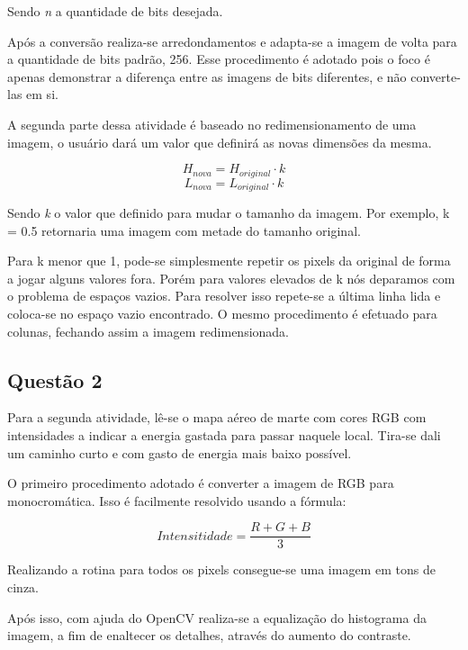 \documentclass[conference]{IEEEtran}
\begin{document}
Sendo \textit{n} a quantidade de bits desejada.

Após a conversão realiza-se arredondamentos e adapta-se a imagem de volta
para a quantidade de bits padrão, 256. Esse procedimento é adotado pois
o foco é apenas demonstrar a diferença entre as imagens de bits diferentes, 
e não converte-las em si.

A segunda parte dessa atividade é baseado no redimensionamento de uma imagem,
o usuário dará um valor que definirá as novas dimensões da mesma.

\begin{equation}
    H_{nova} = H_{original} \cdot k
\end{equation}
\begin{equation}
    L_{nova} = L_{original} \cdot k
\end{equation}

Sendo \textit{k} o valor que definido para mudar o tamanho da imagem. 
Por exemplo, k = 0.5 retornaria uma imagem com metade do tamanho original.

Para k menor que 1, pode-se simplesmente repetir os pixels da original
de forma a jogar alguns valores fora. 
Porém para valores elevados de k nós deparamos com o problema de espaços vazios.
Para resolver isso repete-se a última linha lida e coloca-se no espaço vazio encontrado.
O mesmo procedimento é efetuado para colunas, fechando assim a imagem redimensionada.

\subsection{Questão 2}

Para a segunda atividade, lê-se o mapa aéreo de marte com cores RGB com intensidades
a indicar a energia gastada para passar naquele local. Tira-se dali um caminho curto e com
gasto de energia mais baixo possível.

O primeiro procedimento adotado é converter a imagem de RGB para monocromática. Isso é facilmente
resolvido usando a fórmula:

\begin{equation}
    \label{eq5}
    Intensitidade = \frac{R+G+B}{3}
\end{equation}

Realizando a rotina para todos os pixels consegue-se uma imagem em tons
de cinza. 

Após isso, com ajuda do OpenCV realiza-se a equalização do histograma da imagem,
a fim de enaltecer os detalhes, através do aumento do contraste.
\end{document}
